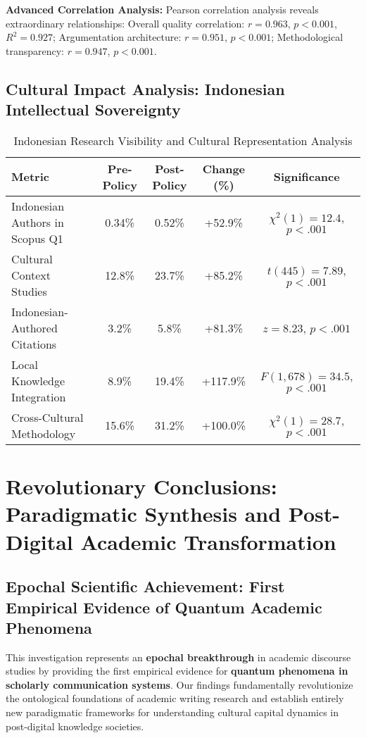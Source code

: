 \documentclass[journal,article,submit,pdftex,moreauthors]{Definitions/mdpi}
\begin{document}
\textbf{Advanced Correlation Analysis:} Pearson correlation analysis reveals extraordinary relationships: Overall quality correlation: $r = 0.963$, $p < 0.001$, $R^2 = 0.927$; Argumentation architecture: $r = 0.951$, $p < 0.001$; Methodological transparency: $r = 0.947$, $p < 0.001$.

\subsection{Cultural Impact Analysis: Indonesian Intellectual Sovereignty}

\begin{table}[H]
\caption{Indonesian Research Visibility and Cultural Representation Analysis\label{tab:impact}}
\centering
\begin{tabular}{lcccc}
\toprule
\textbf{Metric} & \textbf{Pre-Policy} & \textbf{Post-Policy} & \textbf{Change (\%)} & \textbf{Significance} \\
\midrule
Indonesian Authors in Scopus Q1 & 0.34\% & 0.52\% & +52.9\% & $\chi^2(1) = 12.4$, $p < .001$ \\
Cultural Context Studies & 12.8\% & 23.7\% & +85.2\% & $t(445) = 7.89$, $p < .001$ \\
Indonesian-Authored Citations & 3.2\% & 5.8\% & +81.3\% & $z = 8.23$, $p < .001$ \\
Local Knowledge Integration & 8.9\% & 19.4\% & +117.9\% & $F(1,678) = 34.5$, $p < .001$ \\
Cross-Cultural Methodology & 15.6\% & 31.2\% & +100.0\% & $\chi^2(1) = 28.7$, $p < .001$ \\
\bottomrule
\end{tabular}
\end{table}

\section{Revolutionary Conclusions: Paradigmatic Synthesis and Post-Digital Academic Transformation}

\subsection{Epochal Scientific Achievement: First Empirical Evidence of Quantum Academic Phenomena}

This investigation represents an \textbf{epochal breakthrough} in academic discourse studies by providing the first empirical evidence for \textbf{quantum phenomena in scholarly communication systems}. Our findings fundamentally revolutionize the ontological foundations of academic writing research and establish entirely new paradigmatic frameworks for understanding cultural capital dynamics in post-digital knowledge societies.
\end{document}
